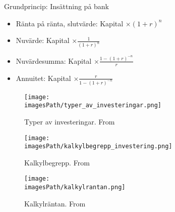 Grundprincip: Insättning på bank
\begin{itemize}
    \item Ränta på ränta, slutvärde: Kapital $\times (1+r)^n$
    \item Nuvärde: Kapital $\times \frac{1}{(1+r)^n}$
    \item Nuvärdesumma: Kapital $\times \frac{1-(1+r)^{-n}}{r}$
    \item Annuitet: Kapital $\times \frac{r}{1-(1+r)^{-n}}$
\end{itemize}

\begin{figure}[H]
    \centering
    \texttt{[image: \\imagesPath/typer\_av\_investeringar.png]}
    \caption{Typer av investeringar. From \cite{im}}
\end{figure}

\begin{figure}[H]
    \centering
    \texttt{[image: \\imagesPath/kalkylbegrepp\_investering.png]}
    \caption{Kalkylbegrepp. From \cite{im}}
\end{figure}

\begin{figure}[H]
    \centering
    \texttt{[image: \\imagesPath/kalkylrantan.png]}
    \caption{Kalkylräntan. From \cite{im}}
\end{figure}

